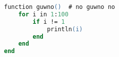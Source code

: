 \documentclass[11pt, wide]{mwart}
\begin{document}
\maketitle
\tableofcontents

\begin{lstlisting}[language=ps]
function guwno()  # no guwno no
    for i in 1:100
        if i != 1
            println(i)
        end
    end
end
\end{lstlisting}
\end{document}
